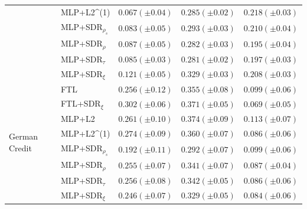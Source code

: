 \begin{tabular}{lllll}
 & MLP+L2^{(1)} & $0.067 (\pm0.04)$ & $0.285 (\pm0.02)$ & $0.218 (\pm0.03)$ \\
 & MLP+SDR$_{\rho_s}$ & $0.083 (\pm0.05)$ & $0.293 (\pm0.03)$ & $0.210 (\pm0.04)$ \\
 & MLP+SDR$_{\rho}$ & $0.087 (\pm0.05)$ & $0.282 (\pm0.03)$ & $0.195 (\pm0.04)$ \\
 & MLP+SDR$_{\tau}$ & $0.085 (\pm0.03)$ & $0.281 (\pm0.02)$ & $0.197 (\pm0.03)$ \\
 & MLP+SDR$_{\xi}$ & $0.121 (\pm0.05)$ & $0.329 (\pm0.03)$ & $0.208 (\pm0.03)$ \\
\cline{1-5}
\multirow[t]{8}{*}{German Credit} & FTL & $0.256 (\pm0.12)$ & $0.355 (\pm0.08)$ & $0.099 (\pm0.06)$ \\
 & FTL+SDR$_{\xi}$ & $0.302 (\pm0.06)$ & $0.371 (\pm0.05)$ & $0.069 (\pm0.05)$ \\
 & MLP+L2 & $0.261 (\pm0.10)$ & $0.374 (\pm0.09)$ & $0.113 (\pm0.07)$ \\
 & MLP+L2^{(1)} & $0.274 (\pm0.09)$ & $0.360 (\pm0.07)$ & $0.086 (\pm0.06)$ \\
 & MLP+SDR$_{\rho_s}$ & $0.192 (\pm0.11)$ & $0.292 (\pm0.07)$ & $0.099 (\pm0.06)$ \\
 & MLP+SDR$_{\rho}$ & $0.255 (\pm0.07)$ & $0.341 (\pm0.07)$ & $0.087 (\pm0.04)$ \\
 & MLP+SDR$_{\tau}$ & $0.256 (\pm0.08)$ & $0.342 (\pm0.05)$ & $0.086 (\pm0.06)$ \\
 & MLP+SDR$_{\xi}$ & $0.246 (\pm0.07)$ & $0.329 (\pm0.05)$ & $0.084 (\pm0.06)$ \\
\cline{1-5}
\bottomrule
\end{tabular}

